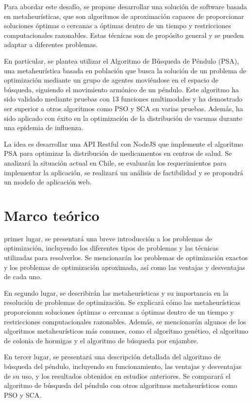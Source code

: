 \documentclass{ieeeaccess}
\begin{document}
Para abordar este desafío, se propone desarrollar una solución de software basada en metaheurísticas, que son algoritmos de aproximación capaces de proporcionar soluciones óptimas o cercanas a óptimas dentro de un tiempo y restricciones computacionales razonables. Estas técnicas son de propósito general y se pueden adaptar a diferentes problemas.

En particular, se plantea utilizar el Algoritmo de Búsqueda de Péndulo (PSA), una metaheurística basada en población que busca la solución de un problema de optimización mediante un grupo de agentes moviéndose en el espacio de búsqueda, siguiendo el movimiento armónico de un péndulo. Este algoritmo ha sido validado mediante pruebas con 13 funciones multimodales y ha demostrado ser superior a otros algoritmos como PSO y SCA en varias pruebas. Además, ha sido aplicado con éxito en la optimización de la distribución de vacunas durante una epidemia de influenza.

La idea es desarrollar una API Restful con NodeJS que implemente el algoritmo PSA para optimizar la distribución de medicamentos en centros de salud. Se analizará la situación actual en Chile, se evaluarán los requerimientos para implementar la aplicación, se realizará un análisis de factibilidad y se propondrá un modelo de aplicación web.

\section{Marco teórico}
\label{sec:TheoreticalFramework}
 primer lugar, se presentará una breve introducción a los problemas de optimización, incluyendo los diferentes tipos de problemas y las técnicas utilizadas para resolverlos. Se mencionarán los problemas de optimización exactos y los problemas de optimización aproximada, así como las ventajas y desventajas de cada uno.

En segundo lugar, se describirán las metaheurísticas y su importancia en la resolución de problemas de optimización. Se explicará cómo las metaheurísticas proporcionan soluciones óptimas o cercanas a óptimas dentro de un tiempo y restricciones computacionales razonables. Además, se mencionarán algunos de los algoritmos metaheurísticos más comunes, como el algoritmo genético, el algoritmo de colonia de hormigas y el algoritmo de búsqueda por enjambre.

En tercer lugar, se presentará una descripción detallada del algoritmo de búsqueda del péndulo, incluyendo su funcionamiento, las ventajas y desventajas de su uso, y los resultados obtenidos en estudios anteriores. Se comparará el algoritmo de búsqueda del péndulo con otros algoritmos metaheurísticos como PSO y SCA.
\end{document}

